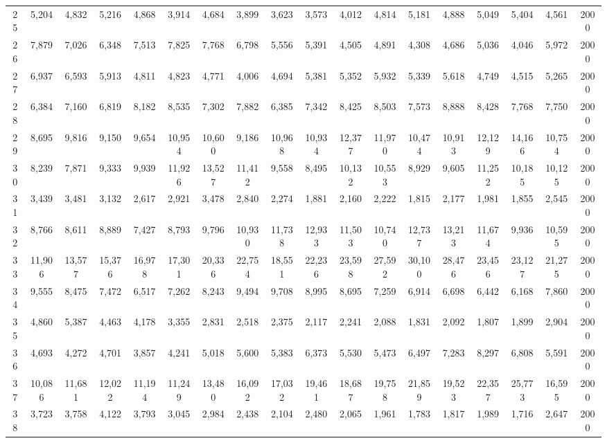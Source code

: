 {\begin{longtable}{ >{\tiny}cccccccccccccccccc}
25  & 5,204  & 4,832  & 5,216  & 4,868  & 3,914  & 4,684  & 3,899  & 3,623  & 3,573  & 4,012  & 4,814  & 5,181  & 4,888  & 5,049  & 5,404  & 4,561  & 2000 \\
26  & 7,879  & 7,026  & 6,348  & 7,513  & 7,825  & 7,768  & 6,798  & 5,556  & 5,391  & 4,505  & 4,891  & 4,308  & 4,686  & 5,036  & 4,046  & 5,972  & 2000 \\
27  & 6,937  & 6,593  & 5,913  & 4,811  & 4,823  & 4,771  & 4,006  & 4,694  & 5,381  & 5,352  & 5,932  & 5,339  & 5,618  & 4,749  & 4,515  & 5,265  & 2000 \\
28  & 6,384  & 7,160  & 6,819  & 8,182  & 8,535  & 7,302  & 7,882  & 6,385  & 7,342  & 8,425  & 8,503  & 7,573  & 8,888  & 8,428  & 7,768  & 7,750  & 2000 \\
29  & 8,695  & 9,816  & 9,150  & 9,654  & 10,954 & 10,600 & 9,186  & 10,968 & 10,934 & 12,377 & 11,970 & 10,474 & 10,913 & 12,129 & 14,166 & 10,754 & 2000 \\
30  & 8,239  & 7,871  & 9,333  & 9,939  & 11,926 & 13,527 & 11,412 & 9,558  & 8,495  & 10,132 & 10,553 & 8,929  & 9,605  & 11,252 & 10,185 & 10,125 & 2000 \\
31  & 3,439  & 3,481  & 3,132  & 2,617  & 2,921  & 3,478  & 2,840  & 2,274  & 1,881  & 2,160  & 2,222  & 1,815  & 2,177  & 1,981  & 1,855  & 2,545  & 2000 \\
32  & 8,766  & 8,611  & 8,889  & 7,427  & 8,793  & 9,796  & 10,930 & 11,738 & 12,933 & 11,503 & 10,740 & 12,737 & 13,213 & 11,674 & 9,936  & 10,595 & 2000 \\
33  & 11,906 & 13,577 & 15,376 & 16,978 & 17,301 & 20,336 & 22,754 & 18,551 & 22,236 & 23,598 & 27,592 & 30,100 & 28,476 & 23,456 & 23,127 & 21,275 & 2000 \\
34  & 9,555  & 8,475  & 7,472  & 6,517  & 7,262  & 8,243  & 9,494  & 9,708  & 8,995  & 8,695  & 7,259  & 6,914  & 6,698  & 6,442  & 6,168  & 7,860  & 2000 \\
35  & 4,860  & 5,387  & 4,463  & 4,178  & 3,355  & 2,831  & 2,518  & 2,375  & 2,117  & 2,241  & 2,088  & 1,831  & 2,092  & 1,807  & 1,899  & 2,904  & 2000 \\
36  & 4,693  & 4,272  & 4,701  & 3,857  & 4,241  & 5,018  & 5,600  & 5,383  & 6,373  & 5,530  & 5,473  & 6,497  & 7,283  & 8,297  & 6,808  & 5,591  & 2000 \\
37  & 10,086 & 11,681 & 12,022 & 11,194 & 11,249 & 13,480 & 16,092 & 17,032 & 19,461 & 18,687 & 19,758 & 21,859 & 19,523 & 22,357 & 25,773 & 16,595 & 2000 \\
38  & 3,723  & 3,758  & 4,122  & 3,793  & 3,045  & 2,984  & 2,438  & 2,104  & 2,480  & 2,065  & 1,961  & 1,783  & 1,817  & 1,989  & 1,716  & 2,647  & 2000 \\

\end{longtable}}
